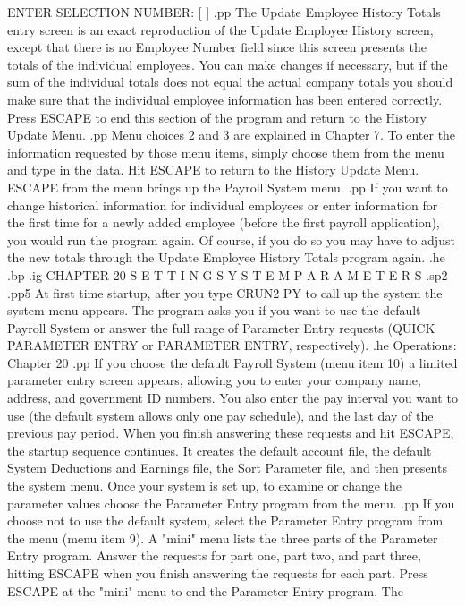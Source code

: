 		  ENTER SELECTION NUMBER: [ ]
.pp
The Update Employee History Totals entry screen is an exact reproduction
of the Update Employee History screen, except that there is no Employee
Number field since this screen presents the totals of the individual
employees.  You can make changes if necessary, but if the sum of the
individual totals does not equal the actual company totals you should
make sure that the individual employee information has been entered
correctly.  Press ESCAPE to end this section of the program and return
to the History Update Menu.
.pp
Menu choices 2 and 3 are explained in Chapter 7.  To enter the
information requested by those menu items, simply choose them
from the menu and type in the data.  Hit ESCAPE to return to the
History Update Menu.  ESCAPE from the menu brings up the Payroll
System menu.
.pp
If you want to change historical information for individual employees
or enter information for the first time for a newly added employee
(before the first payroll application), you would run the program
again.	Of course, if you do so you may have to adjust the new totals
through the Update Employee History Totals program again.
.he
.bp
.ig
CHAPTER 20
S E T T I N G	 S Y S T E M	P A R A M E T E R S
.sp2
.pp5
At first time startup, after you type CRUN2 PY to call up the system
the system menu appears.
The program asks you if you want to use the default Payroll System or
answer the full range of Parameter Entry requests (QUICK PARAMETER ENTRY
or PARAMETER ENTRY, respectively).
.he Operations: Chapter 20
.pp
If you choose the default Payroll System (menu item 10)
a limited parameter entry screen
appears, allowing you to enter your company name, address, and government
ID numbers. You also enter the pay interval you want to use (the default
system allows only one pay schedule), and the last day of the previous
pay period.  When you finish answering these requests and hit ESCAPE, the
startup sequence continues.  It creates the default account file,
the default System Deductions and Earnings file, the
Sort Parameter file, and then presents the system menu.  Once your
system is set up, to examine or change the parameter values
choose the Parameter Entry program from the menu.
.pp
If you choose not to use the default system,
select the Parameter Entry program from the menu (menu item 9).
A "mini" menu lists the three parts of the Parameter Entry program.
Answer the requests for part one, part two, and part three, hitting
ESCAPE when you finish answering the requests for each part. Press
ESCAPE at the "mini" menu to end the Parameter Entry program.  The

